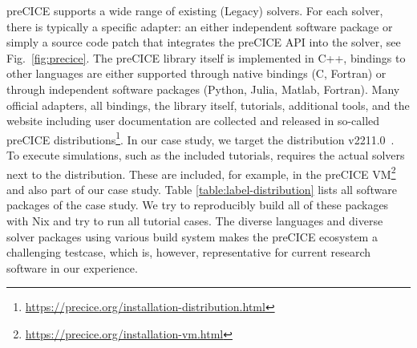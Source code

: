 \documentclass{eceasst}
\begin{document}
preCICE supports a wide range of existing (Legacy) solvers. For each solver, there is typically a specific adapter: an either independent software package or simply a source code patch that integrates the preCICE API into the solver, see Fig.~\ref{fig:precice}.
The preCICE library itself is implemented in C++, bindings to other languages are either supported through native bindings (C, Fortran) or through independent software packages (Python, Julia, Matlab, Fortran).
Many official adapters, all bindings, the library itself, tutorials, additional tools, and the website including user documentation are collected and released in so-called preCICE distributions\footnote{\url{https://precice.org/installation-distribution.html}}.
In our case study, we target the distribution v2211.0~\cite{preciceDistribution}. To execute simulations, such as the included tutorials, requires the actual solvers next to the distribution. These are included, for example, in the preCICE VM\footnote{\url{https://precice.org/installation-vm.html}} and also part of our case study. Table \ref{table:label-distribution} lists all software packages of the case study. We try to reproducibly build all of these packages with Nix and try to run all tutorial cases.
The diverse languages and diverse solver packages using various build system makes the preCICE ecosystem a challenging testcase, which is, however, representative for current research software in our experience.
\end{document}
